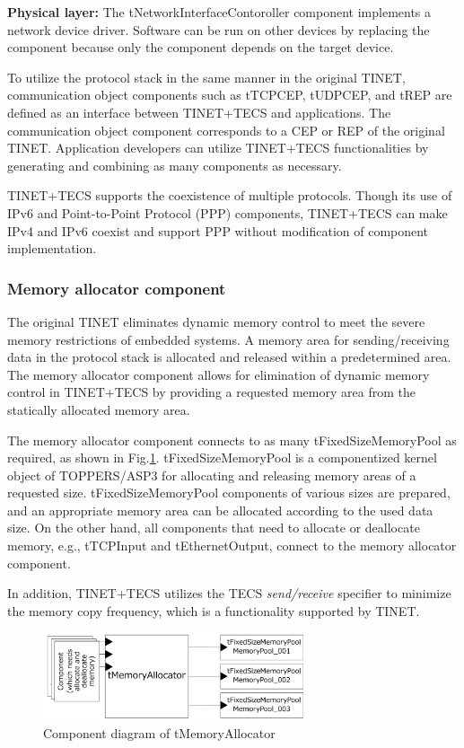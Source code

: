 \documentclass[JIP]{ipsj_v2/UTF8/ipsj}
\begin{document}
{\bf Physical layer:}
The tNetworkInterfaceContoroller component implements a network device driver.
Software can be run on other devices by replacing the component because only the component depends on the target device.

To utilize the protocol stack in the same manner in the original TINET, communication object components such as tTCPCEP, tUDPCEP, and tREP are defined as an interface between TINET+TECS and applications.
The communication object component corresponds to a CEP or REP of the original TINET.
Application developers can utilize TINET+TECS functionalities by generating and combining as many components as necessary.

TINET+TECS supports the coexistence of multiple protocols.
Though its use of IPv6 and Point-to-Point Protocol (PPP) components, TINET+TECS can make IPv4 and IPv6 coexist and support PPP without modification of component implementation.

\subsubsection*{Memory allocator component} 

The original TINET eliminates dynamic memory control to meet the severe memory restrictions of embedded systems.
A memory area for sending/receiving data in the protocol stack is allocated and released within a predetermined area.
The memory allocator component allows for elimination of dynamic memory control in TINET+TECS by providing a requested memory area from the statically allocated memory area.

The memory allocator component connects to as many tFixedSizeMemoryPool as required, as shown in Fig.\ref{fig:tMemoryAllocator}.
tFixedSizeMemoryPool is a componentized kernel object of TOPPERS/ASP3 for allocating and releasing memory areas of a requested size. 
tFixedSizeMemoryPool components of various sizes are prepared, and an appropriate memory area can be allocated according to the used data size.
On the other hand, all components that need to allocate or deallocate memory, e.g., tTCPInput and tEthernetOutput, connect to the memory allocator component.

In addition, TINET+TECS utilizes the TECS {\it send/receive} specifier to minimize the memory copy frequency, which is a functionality supported by TINET.

\begin{figure}[t]
    \centering
    \includegraphics[width=8cm,clip]{figure/tMemoryAllocator.pdf}
    \caption{Component diagram of tMemoryAllocator}
    \label{fig:tMemoryAllocator}
\end{figure}
\end{document}
